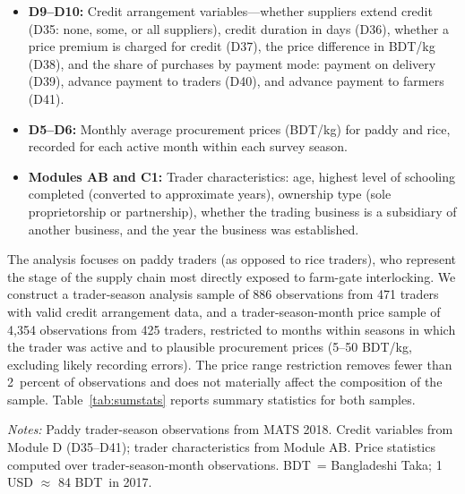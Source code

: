 \documentclass[authoryear,preprint,review,12pt]{elsarticle}
\newcommand{\BDT}{BDT}
\begin{document}
\begin{itemize}
  \item \textbf{D9--D10:} Credit arrangement variables---whether suppliers
  extend credit (D35: none, some, or all suppliers), credit duration in
  days (D36), whether a price premium is charged for credit (D37), the
  price difference in BDT/kg (D38), and the share of purchases by payment
  mode: payment on delivery (D39), advance payment to traders (D40), and
  advance payment to farmers (D41).
  \item \textbf{D5--D6:} Monthly average procurement prices (BDT/kg) for
  paddy and rice, recorded for each active month within each survey season.
  \item \textbf{Modules AB and C1:} Trader characteristics: age, highest
  level of schooling completed (converted to approximate years), ownership
  type (sole proprietorship or partnership), whether the trading business is
  a subsidiary of another business, and the year the business was established.
\end{itemize}

The analysis focuses on paddy traders (as opposed to rice traders), who
represent the stage of the supply chain most directly exposed to farm-gate
interlocking. We construct a trader-season analysis sample of 886 observations
from 471 traders with valid credit arrangement data, and a trader-season-month
price sample of 4,354 observations from 425 traders, restricted to months
within seasons in which the trader was active and to plausible procurement
prices (5--50 BDT/kg, excluding likely recording errors). The price range
restriction removes fewer than 2~percent of observations and does not
materially affect the composition of the sample.
Table~\ref{tab:sumstats} reports summary statistics for both samples.

\begin{table}[tp]
  \centering
  \caption{Summary Statistics}
  \label{tab:sumstats}
  \begin{singlespace}
  \begin{threeparttable}
    
    \begin{tablenotes}\footnotesize
      \item \textit{Notes:} Paddy trader-season observations from MATS 2018.
      Credit variables from Module D (D35--D41); trader characteristics from
      Module AB. Price statistics computed over trader-season-month
      observations. \BDT\ = Bangladeshi Taka; 1 USD $\approx$ 84 \BDT\ in 2017.
    \end{tablenotes}
  \end{threeparttable}
  \end{singlespace}
\end{table}
\end{document}
